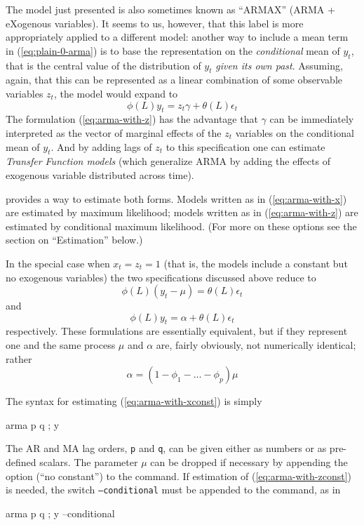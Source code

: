 The model just presented is also sometimes known as ``ARMAX'' (ARMA +
eXogenous variables).  It seems to us, however, that this label is
more appropriately applied to a different model: another way to
include a mean term in (\ref{eq:plain-0-arma}) is to base the
representation on the \emph{conditional} mean of $y_t$, that is the
central value of the distribution of $y_t$ \emph{given its own past}.
Assuming, again, that this can be represented as a linear combination
of some observable variables $z_t$, the model would expand to
\begin{equation}
  \label{eq:arma-with-z}
  \phi(L) y_t = z_t \gamma + \theta(L) \epsilon_t
\end{equation}
The formulation (\ref{eq:arma-with-z}) has the advantage that $\gamma$
can be immediately interpreted as the vector of marginal effects of
the $z_t$ variables on the conditional mean of $y_t$.  And by adding
lags of $z_t$ to this specification one can estimate \emph{Transfer
  Function models} (which generalize ARMA by adding the effects of
exogenous variable distributed across time).

 provides a way to estimate both forms. Models written as
in (\ref{eq:arma-with-x}) are estimated by maximum likelihood; models
written as in (\ref{eq:arma-with-z}) are estimated by conditional
maximum likelihood. (For more on these options see the section on
``Estimation'' below.)  

In the special case when $x_t = z_t = 1$ (that is, the models include
a constant but no exogenous variables) the two specifications discussed
above reduce to
\begin{equation}
  \phi(L) (y_t - \mu) = \theta(L) \epsilon_t
  \label{eq:arma-with-xconst} 
\end{equation}
and
\begin{equation}
  \phi(L) y_t = \alpha + \theta(L) \epsilon_t
  \label{eq:arma-with-zconst}
\end{equation}
respectively.  These formulations are essentially equivalent, but if
they represent one and the same process $\mu$ and $\alpha$ are, fairly
obviously, not numerically identical; rather
\[
\alpha = \left(1 - \phi_1 - \ldots - \phi_p\right) \mu
\]

The  syntax for estimating (\ref{eq:arma-with-xconst}) is simply
\begin{code}
  arma p q ; y
\end{code}
The AR and MA lag orders, \verb|p| and \verb|q|, can be given either as
numbers or as pre-defined scalars. The parameter $\mu$ can be dropped
if necessary by appending the option  (``no constant'') to
the command. If estimation of (\ref{eq:arma-with-zconst}) is needed,
the switch \texttt{--conditional} must be appended to the command, as
in 
\begin{code}
  arma p q ; y --conditional
\end{code}

